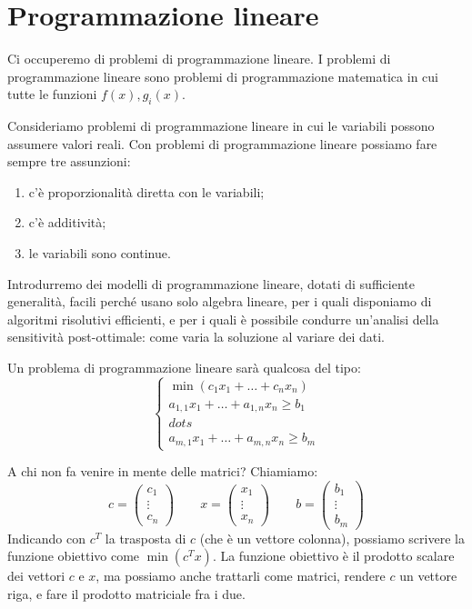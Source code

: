 \section{Programmazione lineare}

Ci occuperemo di problemi di programmazione lineare.
I problemi di programmazione lineare sono problemi di programmazione matematica in cui tutte le funzioni $f(x), g_i(x)$.

Consideriamo problemi di programmazione lineare in cui le variabili possono assumere valori reali.
Con problemi di programmazione lineare possiamo fare sempre tre assunzioni:
\begin{enumerate}
	\item c'\`e proporzionalit\`a diretta con le variabili;
	\item c'\`e additivit\`a;
	\item le variabili sono continue.
\end{enumerate}

Introdurremo dei modelli di programmazione lineare, dotati di sufficiente generalit\`a, facili perch\'e usano solo algebra lineare, per i quali disponiamo di algoritmi risolutivi efficienti, e per i quali \`e possibile condurre un'analisi della sensitivit\`a post-ottimale: come varia la soluzione al variare dei dati.

Un problema di programmazione lineare sar\`a qualcosa del tipo:
\[
	\begin{cases}
		\min \left( c_1 x_1 + \dots + c_n x_n \right) \\
		a_{1,1} x_1 + \dots + a_{1,n} x_n \ge b_1 \\
		dots \\
		a_{m,1} x_1 + \dots + a_{m,n} x_n \ge b_m
	\end{cases}
\]

A chi non fa venire in mente delle matrici?
Chiamiamo:
\[
	c =
	\begin{pmatrix}
		c_1 \\ \vdots \\ c_n
	\end{pmatrix}
	\qquad
	x =
	\begin{pmatrix}
		x_1 \\ \vdots \\ x_n
	\end{pmatrix}
	\qquad
	b =
	\begin{pmatrix}
		b_1 \\ \vdots \\ b_m
	\end{pmatrix}
\]
Indicando con $c^{T}$ la trasposta di $c$ (che \`e un vettore colonna), possiamo scrivere la funzione obiettivo come $\min \left( c^{T} x \right)$.
La funzione obiettivo \`e il prodotto scalare dei vettori $c$ e $x$, ma possiamo anche trattarli come matrici, rendere $c$ un vettore riga, e fare il prodotto matriciale fra i due.

